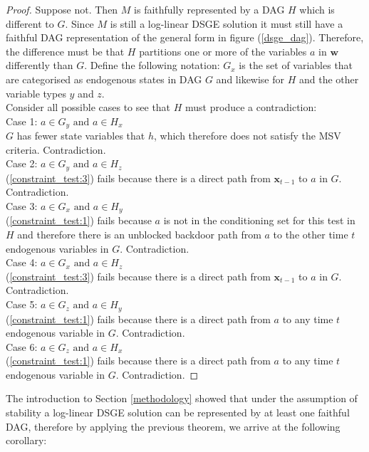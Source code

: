 \documentclass{article}
\begin{document}
\begin{proof}
  Suppose not. Then $M$ is faithfully represented by a DAG $H$ which is different to $G$. Since $M$ is still a log-linear DSGE solution it must still have a faithful DAG representation of the general form in figure (\ref{dsge_dag}). Therefore, the difference must be that $H$ partitions one or more of the variables $a$ in $\mathbf{w}$ differently than $G$. Define the following notation: $G_x$ is the set of variables that are categorised as endogenous states in DAG  $G$ and likewise for $H$ and the other variable types $y$ and $z$. \\
  Consider all possible cases to see that $H$ must produce a contradiction: \\
  Case 1: $a \in G_y \text{ and } a \in H_x$ \\
    $G$ has fewer state variables that $h$, which therefore does not satisfy the MSV criteria. Contradiction. \\
  Case 2: $a \in G_y \text{ and } a \in H_z$ \\
    (\ref{constraint_test:3}) fails because there is a direct path from $\mathbf{x}_{t-1}$ to $a$ in $G$. Contradiction. \\
  Case 3: $a \in G_x \text{ and } a \in H_y$ \\
    (\ref{constraint_test:1}) fails because $a$ is not in the conditioning set for this test in $H$ and therefore there is an unblocked backdoor path from $a$ to the other time $t$ endogenous variables in $G$. Contradiction. \\
  Case 4: $a \in G_x \text{ and } a \in H_z$ \\
    (\ref{constraint_test:3}) fails because there is a direct path from $\mathbf{x}_{t-1}$ to $a$ in $G$. Contradiction. \\
  Case 5: $a \in G_z \text{ and } a \in H_y$ \\
    (\ref{constraint_test:1}) fails because there is a direct path from $a$ to any time $t$ endogenous variable in $G$. Contradiction. \\
  Case 6: $a \in G_z \text{ and } a \in H_x$ \\
    (\ref{constraint_test:1}) fails because there is a direct path from $a$ to any time $t$ endogenous variable in $G$. Contradiction. 
\end{proof}

The introduction to Section \ref{methodology} showed that under the assumption of stability a log-linear DSGE solution can be represented by at least one faithful DAG, therefore by applying the previous theorem, we arrive at the following corollary:
\end{document}
